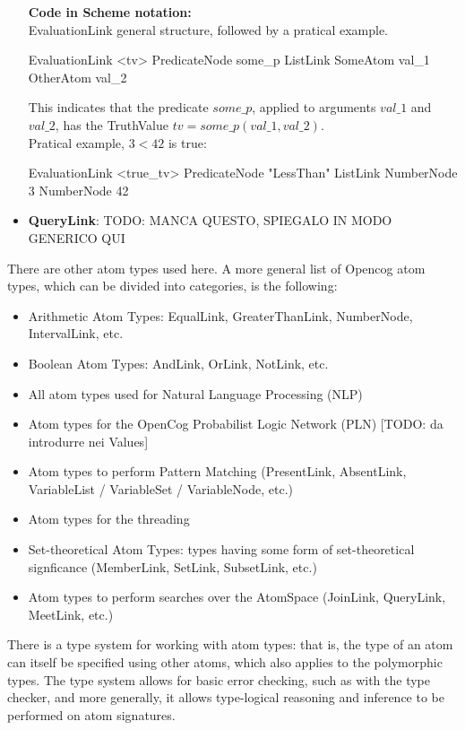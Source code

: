 \begin{itemize}
\begin{footnotesize}\textbf{Code in Scheme notation:} \\
EvaluationLink general structure, followed by a pratical example.
\end{footnotesize}
\begin{python}
	EvaluationLink <tv>
   		PredicateNode some_p
   		ListLink
       			SomeAtom val_1
       			OtherAtom val_2
\end{python}
This indicates that the predicate $some\_p$, applied to arguments $val\_1$ and $val\_2$, has the TruthValue $tv = some\_p(val\_1, val\_2)$. \\
Pratical example, $3 < 42$ is true:
\begin{python}
	 EvaluationLink <true_tv>
		PredicateNode "LessThan"
		ListLink
			NumberNode 3
			NumberNode 42
\end{python}

	\item \textbf{QueryLink}: TODO: MANCA QUESTO, SPIEGALO IN MODO GENERICO QUI \\
\end{itemize}

There are other atom types used here. A more general list of Opencog atom types, which can be divided into categories, is the following:

\begin{itemize}
\item Arithmetic Atom Types: EqualLink, GreaterThanLink, NumberNode, IntervalLink, etc.
\item Boolean Atom Types: AndLink, OrLink, NotLink, etc. 
\item All atom types used for Natural Language Processing (NLP)
\item Atom types for the OpenCog Probabilist Logic Network (PLN) [TODO: da introdurre nei Values]
\item Atom types to perform Pattern Matching (PresentLink, AbsentLink, VariableList / VariableSet / VariableNode, etc.) 
\item Atom types for the threading 
\item Set-theoretical Atom Types: types having some form of set-theoretical signficance (MemberLink, SetLink, SubsetLink, etc.)
\item Atom types to perform searches over the AtomSpace (JoinLink, QueryLink, MeetLink, etc.) 
\end{itemize}

There is a type system for working with atom types: that is, the type of an atom can itself be specified using other atoms, which also applies to the polymorphic types. The type system allows for basic error checking, such as with the type checker, and more generally, it allows type-logical reasoning and inference to be performed on atom signatures. \\

